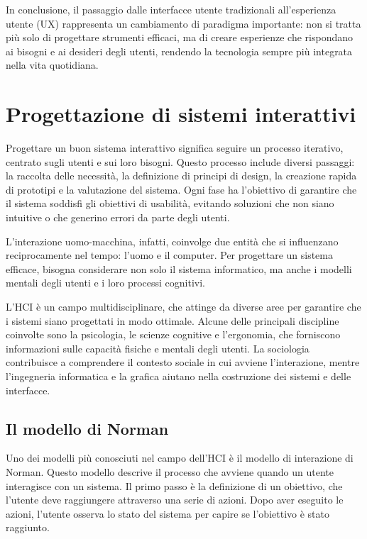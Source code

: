 In conclusione, il passaggio dalle interfacce utente tradizionali all'esperienza utente (UX) rappresenta un cambiamento di paradigma importante: non si tratta più solo di progettare strumenti efficaci, ma di creare esperienze che rispondano ai bisogni e ai desideri degli utenti, rendendo la tecnologia sempre più integrata nella vita quotidiana.

\section{Progettazione di sistemi interattivi}
Progettare un buon sistema interattivo significa seguire un processo iterativo, centrato sugli utenti e sui loro bisogni. Questo processo include diversi passaggi: la raccolta delle necessità, la definizione di principi di design, la creazione rapida di prototipi e la valutazione del sistema. Ogni fase ha l’obiettivo di garantire che il sistema soddisfi gli obiettivi di usabilità, evitando soluzioni che non siano intuitive o che generino errori da parte degli utenti.

L'interazione uomo-macchina, infatti, coinvolge due entità che si influenzano reciprocamente nel tempo: l'uomo e il computer. Per progettare un sistema efficace, bisogna considerare non solo il sistema informatico, ma anche i modelli mentali degli utenti e i loro processi cognitivi.

L'HCI è un campo multidisciplinare, che attinge da diverse aree per garantire che i sistemi siano progettati in modo ottimale. Alcune delle principali discipline coinvolte sono la psicologia, le scienze cognitive e l’ergonomia, che forniscono informazioni sulle capacità fisiche e mentali degli utenti. La sociologia contribuisce a comprendere il contesto sociale in cui avviene l’interazione, mentre l’ingegneria informatica e la grafica aiutano nella costruzione dei sistemi e delle interfacce.

\subsection{Il modello di Norman}
Uno dei modelli più conosciuti nel campo dell'HCI è il modello di interazione di Norman. Questo modello descrive il processo che avviene quando un utente interagisce con un sistema. Il primo passo è la definizione di un obiettivo, che l'utente deve raggiungere attraverso una serie di azioni. Dopo aver eseguito le azioni, l'utente osserva lo stato del sistema per capire se l'obiettivo è stato raggiunto.

